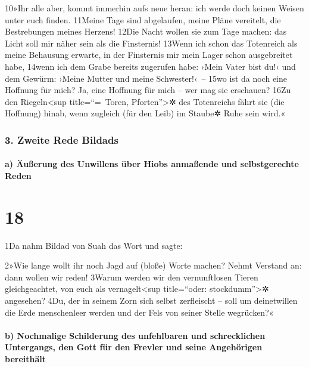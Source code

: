 10»Ihr alle aber, kommt immerhin aufs neue heran: ich werde doch keinen
Weisen unter euch finden. 11Meine Tage sind abgelaufen, meine Pläne
vereitelt, die Bestrebungen meines Herzens! 12Die Nacht wollen sie zum
Tage machen: das Licht soll mir näher sein als die Finsternis! 13Wenn
ich schon das Totenreich als meine Behausung erwarte, in der Finsternis
mir mein Lager schon ausgebreitet habe, 14wenn ich dem Grabe bereits
zugerufen habe: ›Mein Vater bist du!‹ und dem Gewürm: ›Meine Mutter und
meine Schwester!‹~-- 15wo ist da noch eine Hoffnung für mich? Ja, eine
Hoffnung für mich -- wer mag sie erschauen? 16Zu den
Riegeln\textless sup title=``=~Toren, Pforten''\textgreater✲ des
Totenreichs fährt sie (die Hoffnung) hinab, wenn zugleich (für den Leib)
im Staube✲ Ruhe sein wird.«

\hypertarget{zweite-rede-bildads}{%
\subsubsection{3. Zweite Rede Bildads}\label{zweite-rede-bildads}}

\hypertarget{a-uxe4uuxdferung-des-unwillens-uxfcber-hiobs-anmauxdfende-und-selbstgerechte-reden}{%
\paragraph{a) Äußerung des Unwillens über Hiobs anmaßende und
selbstgerechte
Reden}\label{a-uxe4uuxdferung-des-unwillens-uxfcber-hiobs-anmauxdfende-und-selbstgerechte-reden}}

\hypertarget{section-17}{%
\section{18}\label{section-17}}

1Da nahm Bildad von Suah das Wort und sagte:

2»Wie lange wollt ihr noch Jagd auf (bloße) Worte machen? Nehmt Verstand
an: dann wollen wir reden! 3Warum werden wir den vernunftlosen Tieren
gleichgeachtet, von euch als vernagelt\textless sup title=``oder:
stockdumm''\textgreater✲ angesehen? 4Du, der in seinem Zorn sich selbst
zerfleischt -- soll um deinetwillen die Erde menschenleer werden und der
Fels von seiner Stelle wegrücken?«

\hypertarget{b-nochmalige-schilderung-des-unfehlbaren-und-schrecklichen-untergangs-den-gott-fuxfcr-den-frevler-und-seine-angehuxf6rigen-bereithuxe4lt}{%
\paragraph{b) Nochmalige Schilderung des unfehlbaren und schrecklichen
Untergangs, den Gott für den Frevler und seine Angehörigen
bereithält}\label{b-nochmalige-schilderung-des-unfehlbaren-und-schrecklichen-untergangs-den-gott-fuxfcr-den-frevler-und-seine-angehuxf6rigen-bereithuxe4lt}}

